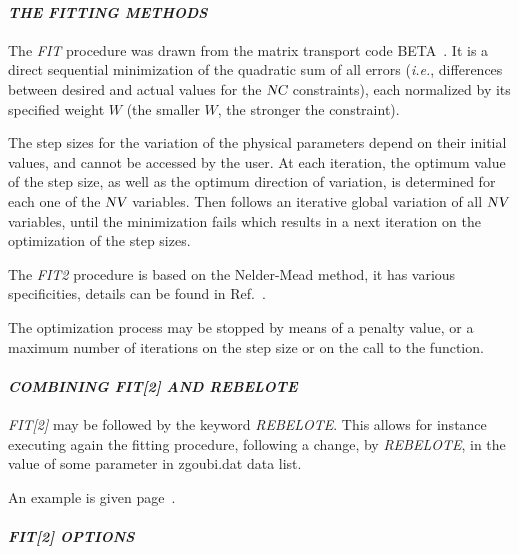 {\smallskip

\paragraph{\textsl{THE FITTING METHODS }}    %


\noindent The   \textsl{FIT} procedure was drawn from  the matrix transport code BETA~\cite{Biblio10}. 
 It is a direct sequential minimization of the quadratic
sum of all errors (\emph{i.e.}, differences between desired and actual values for the $\textsl{NC}$ 
constraints), each normalized by its specified weight $ W $ (the smaller $ W$,
the stronger the constraint). 

\noindent The step sizes for the variation of the physical parameters depend
on their initial  values, and cannot be accessed by the user. At each iteration, the 
optimum value of the step size, as well as the optimum direction of variation,
is determined for each one of the $\textsl{NV}$ variables. Then follows an iterative
global variation of all $\textsl{NV}$ variables, until the minimization fails which results in a
next iteration on the optimization of the step sizes. 

\medskip

\noindent The \textsl{FIT2} procedure is based on the  Nelder-Mead method, it has various specificities, 
details can be found in Ref.~\cite{NelderMead}.


\medskip

\noindent  The optimization process may be stopped by means of a penalty value, or a maximum number of 
iterations on the step size or on the call to the function. 



\bigskip

\paragraph{\textsl{COMBINING FIT[2] AND REBELOTE } }    %


\noindent \textsl{FIT[2]} may be followed by the keyword  \textsl{REBELOTE}.  This allows for instance executing again 
the  fitting procedure, following a change, by  \textsl{REBELOTE}, in  the value of some parameter in zgoubi.dat data list. 


An example is given page~\pageref{ExaFITREBELOTE}. 



\bigskip

\paragraph{\textsl{FIT[2] OPTIONS} }

}
